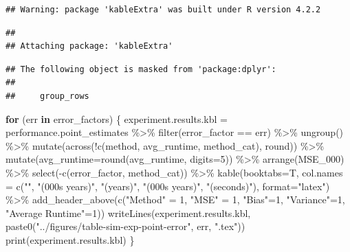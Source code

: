 \documentclass[
]{article}
\newenvironment{Shaded}{\begin{snugshade}}{\end{snugshade}}
\newcommand{\AttributeTok}[1]{\textcolor[rgb]{0.77,0.63,0.00}{#1}}
\newcommand{\ControlFlowTok}[1]{\textcolor[rgb]{0.13,0.29,0.53}{\textbf{#1}}}
\newcommand{\DecValTok}[1]{\textcolor[rgb]{0.00,0.00,0.81}{#1}}
\newcommand{\FunctionTok}[1]{\textcolor[rgb]{0.00,0.00,0.00}{#1}}
\newcommand{\NormalTok}[1]{#1}
\newcommand{\OtherTok}[1]{\textcolor[rgb]{0.56,0.35,0.01}{#1}}
\newcommand{\SpecialCharTok}[1]{\textcolor[rgb]{0.00,0.00,0.00}{#1}}
\newcommand{\StringTok}[1]{\textcolor[rgb]{0.31,0.60,0.02}{#1}}
\begin{document}
\begin{verbatim}
## Warning: package 'kableExtra' was built under R version 4.2.2
\end{verbatim}

\begin{verbatim}
## 
## Attaching package: 'kableExtra'
\end{verbatim}

\begin{verbatim}
## The following object is masked from 'package:dplyr':
## 
##     group_rows
\end{verbatim}

\begin{Shaded}
\begin{Highlighting}[]
\ControlFlowTok{for}\NormalTok{ (err }\ControlFlowTok{in}\NormalTok{ error\_factors) \{}
\NormalTok{  experiment.results.kbl }\OtherTok{=}\NormalTok{ performance.point\_estimates }\SpecialCharTok{\%\textgreater{}\%} 
    \FunctionTok{filter}\NormalTok{(error\_factor }\SpecialCharTok{==}\NormalTok{ err) }\SpecialCharTok{\%\textgreater{}\%} 
    \FunctionTok{ungroup}\NormalTok{() }\SpecialCharTok{\%\textgreater{}\%}
    \FunctionTok{mutate}\NormalTok{(}\FunctionTok{across}\NormalTok{(}\SpecialCharTok{!}\FunctionTok{c}\NormalTok{(method, avg\_runtime, method\_cat), round)) }\SpecialCharTok{\%\textgreater{}\%} 
    \FunctionTok{mutate}\NormalTok{(}\AttributeTok{avg\_runtime=}\FunctionTok{round}\NormalTok{(avg\_runtime, }\AttributeTok{digits=}\DecValTok{5}\NormalTok{)) }\SpecialCharTok{\%\textgreater{}\%}
    \FunctionTok{arrange}\NormalTok{(MSE\_000) }\SpecialCharTok{\%\textgreater{}\%}
    \FunctionTok{select}\NormalTok{(}\SpecialCharTok{{-}}\FunctionTok{c}\NormalTok{(error\_factor, method\_cat)) }\SpecialCharTok{\%\textgreater{}\%}
    \FunctionTok{kable}\NormalTok{(}\AttributeTok{booktabs=}\NormalTok{T, }\AttributeTok{col.names =} \FunctionTok{c}\NormalTok{(}\StringTok{""}\NormalTok{, }\StringTok{"(000\textquotesingle{}s years)"}\NormalTok{, }\StringTok{"(years)"}\NormalTok{, }\StringTok{"(000\textquotesingle{}s years)"}\NormalTok{, }\StringTok{"(seconds)"}\NormalTok{), }\AttributeTok{format=}\StringTok{"latex"}\NormalTok{) }\SpecialCharTok{\%\textgreater{}\%}
    \FunctionTok{add\_header\_above}\NormalTok{(}\FunctionTok{c}\NormalTok{(}\StringTok{"Method"} \OtherTok{=} \DecValTok{1}\NormalTok{, }\StringTok{"MSE"} \OtherTok{=} \DecValTok{1}\NormalTok{, }\StringTok{"Bias"}\OtherTok{=}\DecValTok{1}\NormalTok{, }\StringTok{"Variance"}\OtherTok{=}\DecValTok{1}\NormalTok{, }\StringTok{"Average Runtime"}\OtherTok{=}\DecValTok{1}\NormalTok{))}
  \FunctionTok{writeLines}\NormalTok{(experiment.results.kbl, }\FunctionTok{paste0}\NormalTok{(}\StringTok{"../figures/table{-}sim{-}exp{-}point{-}error"}\NormalTok{, err, }\StringTok{".tex"}\NormalTok{))}
  \FunctionTok{print}\NormalTok{(experiment.results.kbl)}
\NormalTok{\}}
\end{Highlighting}
\end{Shaded}
\end{document}
